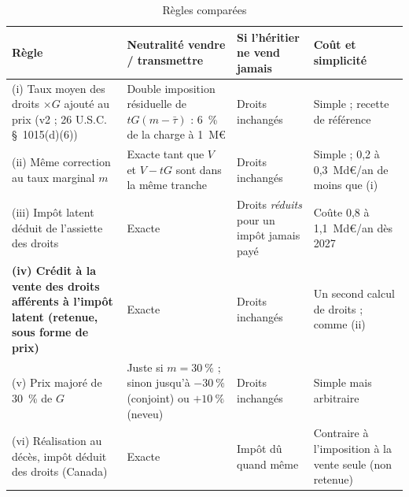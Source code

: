 \begin{table}[!htbp]\centering\scriptsize
\caption{Règles comparées}\label{tab:cap_regles}
\begin{tabular}{@{}p{4.4cm}p{3.1cm}p{3.2cm}p{3.2cm}@{}}
\toprule
Règle & Neutralité vendre / transmettre & Si l'héritier ne vend jamais & Coût et simplicité \\
\midrule
(i) Taux moyen des droits $\times G$ ajouté au prix (v2 ; 26 U.S.C. §~1015(d)(6)) & Double imposition résiduelle
de $tG(m-\bar\tau)$ : 6~\% de la charge à 1~M€ & Droits inchangés & Simple ; recette de référence \\
(ii) Même correction au taux marginal $m$ & Exacte tant que $V$ et $V-tG$ sont dans la même tranche & Droits inchangés
& Simple ; 0,2 à 0,3~Md€/an de moins que (i) \\
(iii) Impôt latent déduit de l'assiette des droits & Exacte & Droits \emph{réduits} pour un impôt jamais payé &
Coûte 0,8 à 1,1~Md€/an dès 2027 \\
\textbf{(iv) Crédit à la vente des droits afférents à l'impôt latent (retenue, sous forme de prix)} & Exacte & Droits
inchangés & Un second calcul de droits ; comme (ii) \\
(v) Prix majoré de 30~\% de $G$ & Juste si $m = 30~\%$ ; sinon jusqu'à $-30~\%$ (conjoint) ou $+10~\%$ (neveu) &
Droits inchangés & Simple mais arbitraire \\
(vi) Réalisation au décès, impôt déduit des droits (Canada) & Exacte & Impôt dû quand même & Contraire à
l'imposition à la vente seule (non retenue) \\
\bottomrule
\end{tabular}
\end{table}

